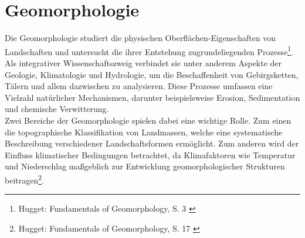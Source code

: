 
\section{Geomorphologie}

Die Geomorphologie studiert die physischen Oberflächen-Eigenschaften von Landschaften und untersucht die ihrer Entstehung zugrundeliegenden Prozesse\footnote{
    Hugget: Fundamentals of Geomorphology, S. 3
    \cite{huggett2022fundamentals}
}. Als integrativer Wissenschaftszweig verbindet sie unter anderem Aspekte der Geologie, Klimatologie und Hydrologie, um die Beschaffenheit von Gebirgsketten, Tälern und allem dazwischen zu analysieren. Diese Prozesse umfassen eine Vielzahl natürlicher Mechanismen, darunter beispielsweise Erosion, Sedimentation und chemische Verwitterung. \\
Zwei Bereiche der Geomorphologie spielen dabei eine wichtige Rolle. Zum einen die topographische Klassifikation von Landmassen, welche eine systematische Beschreibung verschiedener Landschaftsformen ermöglicht. Zum anderen wird der Einfluss klimatischer Bedingungen betrachtet, da Klimafaktoren wie Temperatur und Niederschlag maßgeblich zur Entwicklung geomorphologischer Strukturen beitragen\footnote{
    Hugget: Fundamentals of Geomorphology, S. 17
    \cite{huggett2022fundamentals}
}.




